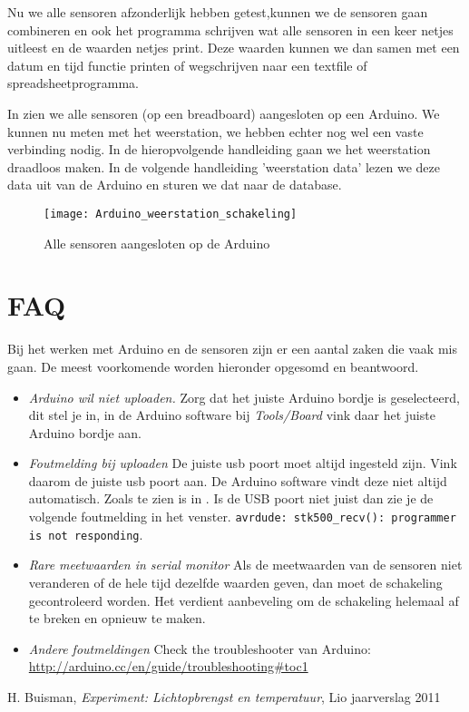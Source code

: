 Nu we alle sensoren afzonderlijk hebben getest,kunnen we de sensoren
gaan combineren en ook het programma schrijven wat alle sensoren in een
keer netjes uitleest en de waarden netjes print. Deze waarden kunnen we
dan samen met een datum en tijd functie printen of wegschrijven naar een
textfile of spreadsheetprogramma.

In  zien we alle sensoren (op
een breadboard) aangesloten op een Arduino. We kunnen nu meten met het weerstation, 
we hebben echter nog wel een vaste verbinding nodig. In de hieropvolgende 
handleiding gaan we het weerstation draadloos maken.  
In de volgende handleiding 'weerstation data' lezen we deze data uit van 
de Arduino en sturen we dat naar de \hisparc database.




\begin{figure}
    \centering
    \texttt{[image: Arduino\_weerstation\_schakeling]}
    \caption{Alle sensoren aangesloten op de Arduino}
   \label{fig:Arduino_weerstation_schakeling}
\end{figure}


\section{FAQ}

Bij het werken met Arduino en de sensoren zijn er een aantal zaken die vaak mis
gaan. De meest voorkomende worden hieronder opgesomd en beantwoord.

\begin{itemize} 
    \item \emph{Arduino wil niet uploaden.} Zorg dat het
    juiste Arduino bordje is geselecteerd, dit stel je in, in de Arduino
    software bij \emph{Tools/Board} vink daar het juiste Arduino bordje aan.
    \item \emph{Foutmelding bij uploaden} De juiste usb poort moet altijd
    ingesteld zijn. Vink daarom de juiste usb poort aan. De Arduino software
    vindt deze niet altijd automatisch. Zoals te zien is in
    . Is de USB poort niet juist dan zie je de
    volgende foutmelding in het venster.
    \verb|avrdude: stk500_recv(): programmer is not responding|.
    \item \emph{Rare meetwaarden in serial
    monitor} Als de meetwaarden van de sensoren niet veranderen of de hele
    tijd dezelfde waarden geven, dan moet de schakeling gecontroleerd
    worden. Het verdient aanbeveling om de schakeling helemaal af te breken
    en opnieuw te maken.
    \item \emph{Andere foutmeldingen} Check the troubleshooter van Arduino: 
    \url{http://arduino.cc/en/guide/troubleshooting#toc1} 
    
\end{itemize}

\begin{thebibliography}{9}
        H. Buisman, \emph{\hisparc Experiment: Lichtopbrengst en temperatuur}, 
        Lio jaarverslag 2011
\end{thebibliography}



